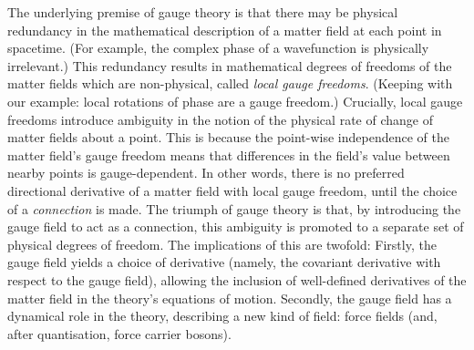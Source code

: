 The underlying premise of gauge theory is that there may be physical redundancy in the mathematical description of a matter field at each point in spacetime.
(For example, the complex phase of a wavefunction is physically irrelevant.)
This redundancy results in mathematical degrees of freedoms of the matter fields which are non-physical, called \emph{local gauge freedoms}.
(Keeping with our example: local rotations of phase are a gauge freedom.)
Crucially, local gauge freedoms introduce ambiguity in the notion of the physical rate of change of matter fields about a point.
This is because the point-wise independence of the matter field's gauge freedom means that differences in the field's value between nearby points is gauge-dependent.
In other words, there is no preferred directional derivative of a matter field with local gauge freedom, until the choice of a \emph{connection} is made.
The triumph of gauge theory is that, by introducing the gauge field to act as a connection, this ambiguity is promoted to a separate set of physical degrees of freedom.
The implications of this are twofold:
Firstly, the gauge field yields a choice of derivative (namely, the covariant derivative with respect to the gauge field), allowing the inclusion of well-defined derivatives of the matter field in the theory's equations of motion.
Secondly, the gauge field has a dynamical role in the theory, describing a new kind of field: force fields (and, after quantisation, force carrier bosons).



